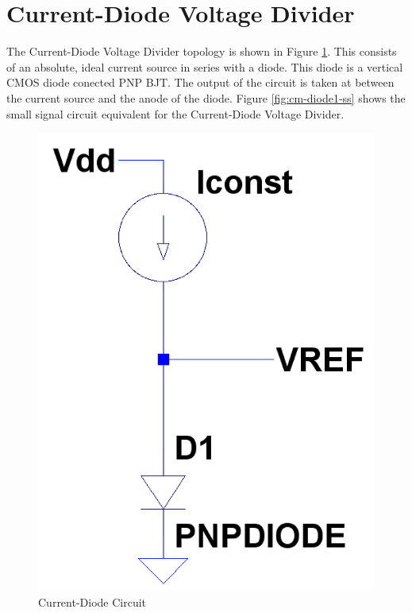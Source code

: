 \documentclass[conference]{IEEEtran}
\begin{document}
\section{Current-Diode Voltage Divider}
The Current-Diode Voltage Divider topology is shown in Figure \ref{fig:cm-diode1}.  This consists of an absolute, ideal current source in series with a diode.  This diode is a vertical CMOS diode conected PNP BJT.  The output of the circuit is taken at between the current source and the anode of the diode.  Figure \ref{fig:cm-diode1-ss} shows the small signal circuit equivalent for the Current-Diode Voltage Divider.
\begin{figure}[!htbp]
  \centering
  \includegraphics[scale=0.25]{images/cm-diode1.png}
  \caption[cm-diode1]{Current-Diode Circuit}
  \label{fig:cm-diode1}
\end{figure}
\end{document}
